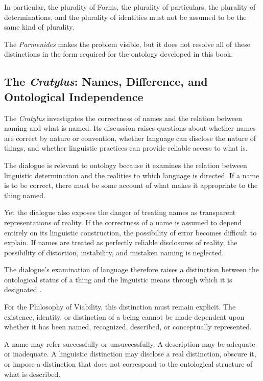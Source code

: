 In particular, the plurality of Forms, the plurality of particulars,
the plurality of determinations, and the plurality of identities
must not be assumed to be the same kind of plurality.

The \textit{Parmenides} makes the problem visible, but it does not
resolve all of these distinctions in the form required for the
ontology developed in this book.

\subsection{The \textit{Cratylus}: Names, Difference, and Ontological Independence}

The \textit{Cratylus} investigates the correctness of names and the
relation between naming and what is named. Its discussion raises
questions about whether names are correct by nature or convention,
whether language can disclose the nature of things, and whether
linguistic practices can provide reliable access to what is.

The dialogue is relevant to ontology because it examines the relation
between linguistic determination and the realities to which language
is directed. If a name is to be correct, there must be some account
of what makes it appropriate to the thing named.

Yet the dialogue also exposes the danger of treating names as
transparent representations of reality. If the correctness of a name
is assumed to depend entirely on its linguistic construction, the
possibility of error becomes difficult to explain. If names are
treated as perfectly reliable disclosures of reality, the possibility
of distortion, instability, and mistaken naming is neglected.

The dialogue's examination of language therefore raises a distinction
between the ontological status of a thing and the linguistic means
through which it is designated \citep{PlatoCratylus}.

For the Philosophy of Viability, this distinction must remain explicit.
The existence, identity, or distinction of a being cannot be made
dependent upon whether it has been named, recognized, described, or
conceptually represented.

A name may refer successfully or unsuccessfully. A description may
be adequate or inadequate. A linguistic distinction may disclose
a real distinction, obscure it, or impose a distinction that does
not correspond to the ontological structure of what is described.

